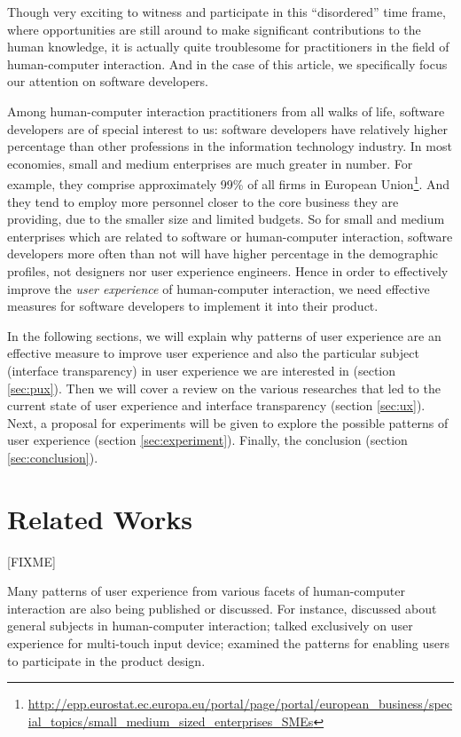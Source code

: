 \documentclass{acm_proc_article-sp}
\begin{document}
Though very exciting to witness and participate in this ``disordered''
time frame, where opportunities are still around to make significant
contributions to the human knowledge, it is actually quite troublesome
for practitioners in the field of human-computer interaction. And in
the case of this article, we specifically focus our attention on
software developers.

Among human-computer interaction practitioners from all walks of life,
software developers are of special interest to us: software developers
have relatively higher percentage than other professions in the
information technology industry. In most economies, small and medium
enterprises are much greater in number. For example, they comprise
approximately 99\% of all firms in European
Union\footnote{\url{http://epp.eurostat.ec.europa.eu/portal/page/portal/european_business/special_topics/small_medium_sized_enterprises_SMEs}}. And
they tend to employ more personnel closer to the core business they
are providing, due to the smaller size and limited budgets. So for
small and medium enterprises which are related to software or
human-computer interaction, software developers more often than not
will have higher percentage in the demographic profiles, not designers
nor user experience engineers. Hence in order to effectively improve
the \textit{user experience} of human-computer interaction, we need
effective measures for software developers to implement it into their
product.

In the following sections, we will explain why patterns of user
experience are an effective measure to improve user experience and
also the particular subject (interface transparency) in user
experience we are interested in (section \ref{sec:pux}). Then we will
cover a review on the various researches that led to the current state
of user experience and interface transparency (section
\ref{sec:ux}). Next, a proposal for experiments will be given to
explore the possible patterns of user experience (section
\ref{sec:experiment}). Finally, the conclusion (section
\ref{sec:conclusion}).


\section{Related Works}
\label{sec:relatedworks}
[FIXME]

Many patterns of user experience from various facets of human-computer
interaction are also being published or discussed.  For instance,
\citet{patterns:tidwell} discussed about general subjects in
human-computer interaction; \citet{touch:boudreaux} talked exclusively
on user experience for multi-touch input device;
\citet{participatory:dearden} examined the patterns for enabling users
to participate in the product design.
\end{document}

